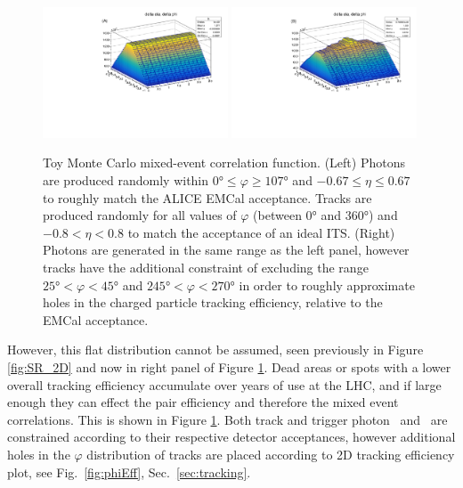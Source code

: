 \begin{figure}[htpb]
	\includegraphics[width=0.49\textwidth]{Data_Analysis/EventMixing/toy_MC_no_holes.pdf}
	\includegraphics[width=0.49\textwidth]{Data_Analysis/EventMixing/toy_MC_holes.pdf}
  \caption{Toy Monte Carlo mixed-event correlation function. (Left) Photons are produced randomly within $0\si{\degree{}}\leq \varphi \geq 107\si{\degree{}}$ and $ -0.67 \leq \eta \leq 0.67$ to roughly match the ALICE EMCal acceptance. Tracks are produced randomly for all values of $\varphi$ (between 0$\si{\degree{}}$ and 360$\si{\degree{}}$) and $-0.8 < \eta < 0.8$ to match the acceptance of an ideal ITS. (Right) Photons are generated in the same range as the left panel, however tracks have the additional constraint of excluding the range $ 25\si{\degree{}}< \varphi < 45\si{\degree{}}$ and $ 245\si{\degree{}} < \varphi < 270\si{\degree{}}$ in order to roughly approximate holes in the charged particle tracking efficiency, relative to the EMCal acceptance.} 
	\label{fig:toy_MC}
\end{figure}

However, this flat distribution cannot be assumed, seen previously in Figure \ref{fig:SR_2D} and now in right panel of Figure \ref{fig:toy_MC}. Dead areas or spots with a lower overall tracking efficiency accumulate over years of use at the LHC, and if large enough they can effect the pair efficiency and therefore the mixed event correlations. This is shown in Figure \ref{fig:toy_MC}. Both track and trigger photon \deltaeta~and \deltaphi~are constrained according to their respective detector acceptances, however additional holes in the $\varphi$ distribution of tracks are placed according to 2D tracking efficiency plot, see Fig.~\ref{fig:phiEff}, Sec.~\ref{sec:tracking}.

